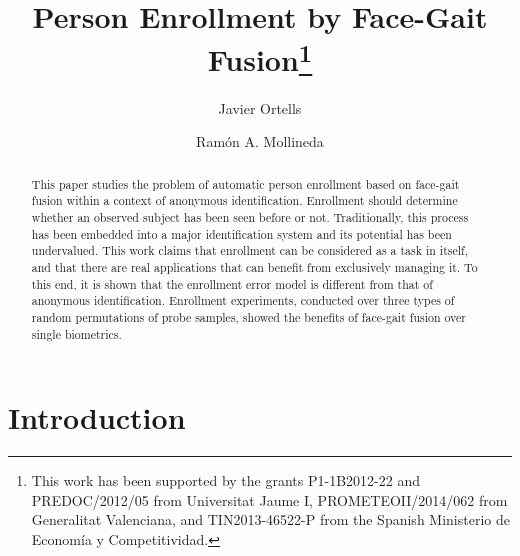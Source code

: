 \documentclass{llncs}
\begin{document}
%
\frontmatter          %
\renewcommand{\arraystretch}{1.2}
\setlength{\tabcolsep}{10pt}
%
\pagestyle{headings}  %
%
%
\title{Person Enrollment by Face-Gait Fusion\thanks{This work has been supported by the grants P1-1B2012-22 and PREDOC/2012/05 from Universitat Jaume I, PROMETEOII/2014/062 from Generalitat Valenciana, and TIN2013-46522-P from the Spanish Ministerio de Econom\'ia y Competitividad.}}
%

\author{Javier Ortells \and Ram\'on A. Mollineda}


%

\maketitle              

\begin{abstract}
This paper studies the problem of automatic person enrollment based on face-gait fusion within a context of anonymous identification. Enrollment should determine whether an observed subject has been seen before or not. Traditionally, this process has been embedded into a major identification system and its potential has been undervalued. This work claims that enrollment can be considered as a task in itself, and that there are real applications that can benefit from exclusively managing it. To this end, it is shown that the enrollment error model is different from that of anonymous identification. Enrollment experiments, conducted over three types of random permutations of probe samples, showed the benefits of face-gait fusion over single biometrics.

\vspace{-2mm}
\end{abstract}
%
\section{Introduction}\label{sec:introduction}
\end{document}
